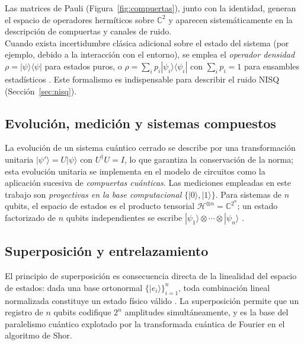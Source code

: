 \documentclass[12pt, spanish]{book}
\begin{document}
Las matrices de Pauli (Figura~\ref{fig:compuertas}), junto con la identidad, generan el espacio de operadores hermíticos sobre $\mathbb{C}^2$ \cite{Nielsen2024} y aparecen sistemáticamente en la descripción de compuertas y canales de ruido.\\

Cuando exista incertidumbre clásica adicional sobre el estado del sistema (por ejemplo, debido a la interacción con el entorno), se emplea el \textit{operador densidad} $\rho = |\psi\rangle\langle\psi|$ para estados puros, o $\rho = \sum_i p_i |\psi_i\rangle\langle\psi_i|$ con $\sum_i p_i = 1$ para ensambles estadísticos \cite{Nielsen2024, Watrous2018}. Este formalismo es indispensable para describir el ruido NISQ (Sección~\ref{sec:nisq}).

\subsection{Evolución, medición y sistemas compuestos}
\label{sec:evolucion_medicion_compuestos}
 
La evolución de un sistema cuántico cerrado se describe por una transformación unitaria $|\psi'\rangle = U|\psi\rangle$ con $U^{\dagger}U = I$, lo que garantiza la conservación de la norma; esta evolución unitaria se implementa en el modelo de circuitos como la aplicación sucesiva de \textit{compuertas cuánticas}. Las mediciones empleadas en este trabajo son \textit{proyectivas en la base computacional} $\{|0\rangle, |1\rangle\}$. Para sistemas de $n$ qubits, el espacio de estados es el producto tensorial $\mathcal{H}^{\otimes n} = \mathbb{C}^{2^n}$; un estado factorizado de $n$ qubits independientes se escribe $|\psi_1\rangle \otimes \cdots \otimes |\psi_n\rangle$ \cite{Nielsen2024}.
 
\subsection{Superposición y entrelazamiento}
\label{sec:superposicion_entrelazamiento}
 
El principio de superposición es consecuencia directa de la linealidad del espacio de estados: dada una base ortonormal $\{|e_i\rangle\}_{i=1}^{n}$, toda combinación lineal normalizada constituye un estado físico válido \cite{Nielsen2024, Wong2022}. La superposición permite que un registro de $n$ qubits codifique $2^n$ amplitudes simultáneamente, y es la base del paralelismo cuántico explotado por la transformada cuántica de Fourier en el algoritmo de Shor.\\
 
\end{document}
